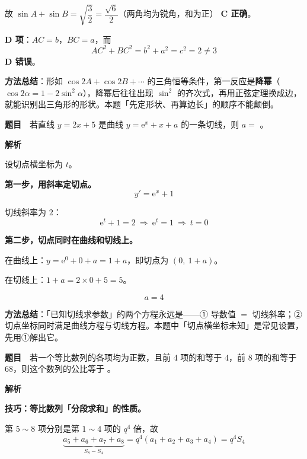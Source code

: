 故 $\sin A+\sin B=\sqrt{\dfrac32}=\dfrac{\sqrt6}{2}$（两角均为锐角，和为正） \textbf{C 正确}。

\textbf{D 项}：$AC=b$，$BC=a$，而
\[AC^2+BC^2=b^2+a^2=c^2=2\ne3\]
 \textbf{D 错误}。


\begin{gktip}
\textbf{方法总结}：形如 $\cos2A+\cos2B+\cdots$ 的三角恒等条件，第一反应是\textbf{降幂}（$\cos2\alpha=1-2\sin^2\alpha$），降幂后往往出现 $\sin^2$ 的齐次式，再用正弦定理换成边，就能识别出三角形的形状。本题「先定形状、再算边长」的顺序不能颠倒。
\end{gktip}

\par\medskip



\textbf{题目}　若直线 $y=2x+5$ 是曲线 $y=\mathrm e^x+x+a$ 的一条切线，则 $a=$ \gkblank{}。

\textbf{解析}

设切点横坐标为 $t$。

\textbf{第一步，用斜率定切点。}
\[y'=\mathrm e^x+1\]

切线斜率为 $2$：
\[\mathrm e^t+1=2\ \Longrightarrow\ \mathrm e^t=1\ \Longrightarrow\ t=0\]

\textbf{第二步，切点同时在曲线和切线上。}

在曲线上：$y=\mathrm e^0+0+a=1+a$，即切点为 $(0,\ 1+a)$。

在切线上：$1+a=2\times0+5=5$。

\[a=4\]


\begin{gktip}
\textbf{方法总结}：「已知切线求参数」的两个方程永远是——① 导数值 $=$ 切线斜率；② 切点坐标同时满足曲线方程与切线方程。本题中「切点横坐标未知」是常见设置，先用①解出它。
\end{gktip}

\par\medskip


\textbf{题目}　若一个等比数列的各项均为正数，且前 $4$ 项的和等于 $4$，前 $8$ 项的和等于 $68$，则这个数列的公比等于 \gkblank{}。

\textbf{解析}

\textbf{技巧：等比数列「分段求和」的性质。}

第 $5\sim8$ 项分别是第 $1\sim4$ 项的 $q^4$ 倍，故
\[\underbrace{a_5+a_6+a_7+a_8}_{S_8-S_4}=q^4\left(a_1+a_2+a_3+a_4\right)=q^4S_4\]

